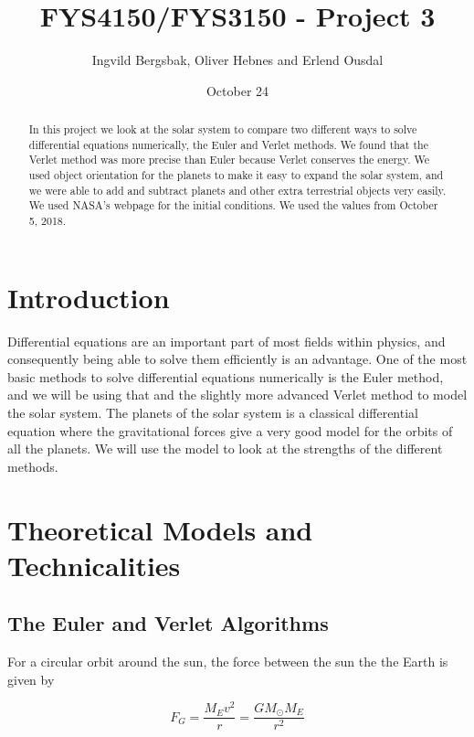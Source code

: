 \documentclass{article}
\begin{document}
\title{\textbf{FYS4150/FYS3150 - Project 3}}
\author{Ingvild Bergsbak, Oliver Hebnes and Erlend Ousdal}
\date{October 24}




\maketitle

\begin{abstract}
In this project we look at the solar system to compare two different ways to solve differential equations numerically, the Euler and Verlet methods. We found that the Verlet method was more precise than Euler because Verlet conserves the energy. We used object orientation for the planets to make it easy to expand the solar system, and we were able to add and subtract planets and other extra terrestrial objects very easily. We used NASA's webpage \cite{NASA} for the initial conditions. We used the values from October 5, 2018.
\end{abstract}

\section{Introduction}
Differential equations are an important part of most fields within physics, and consequently being able to solve them efficiently is an advantage. One of the most basic methods to solve differential equations numerically is the Euler method, and we will be using that and the slightly more advanced Verlet method to model the solar system. The planets of the solar system is a classical differential equation where the gravitational forces give a very good model for the orbits of all the planets. We will use the model to look at the strengths of the different methods.


\section{Theoretical Models and Technicalities}

\subsection{The Euler and Verlet Algorithms}

For a circular orbit around the sun, the force between the sun the the Earth is given by

$$F_G=\frac{M_Ev^2}{r}=\frac{GM_{\odot}M_E}{r^2}$$
\end{document}
